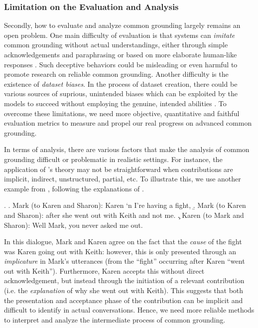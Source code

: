 \subsubsection{Limitation on the Evaluation and Analysis}

Secondly, how to evaluate and analyze common grounding largely remains an open problem.
One main difficulty of evaluation is that systems can \textit{imitate} common grounding without actual understandings, either through simple acknowledgements and paraphrasing \citep{weizenbaum1966eliza} or based on more elaborate human-like responses \citep{adiwardana2020towards,roller-etal-2021-recipes}. Such deceptive behaviors could be misleading or even harmful to promote research on reliable common grounding. Another difficulty is the existence of \textit{dataset biases}. In the process of dataset creation, there could be various sources of suprious, unintended biases \citep{goyal2017making,gururangan-etal-2018-annotation,geva-etal-2019-modeling} which can be exploited by the models to succeed without employing the genuine, intended abilities \citep{geirhos2020shortcut}. To overcome these limitations, we need more objective, quantitative and faithful evaluation metrics to measure and propel our real progress on advanced common grounding.

In terms of analysis, there are various factors that make the analysis of common grounding difficult or problematic in realistic settings. For instance, the application of \citeauthor{clark1989contributing}'s theory may not be straightforward when contributions are implicit, indirect, unstructured, partial, etc. To illustrate this, we use another example from \citet{Sacks1974ASS}, following the explanations of \citet{lascarides2009agreement}.

\ex. \label{ex_2:event_reference}
\a. Mark (to Karen and Sharon):\; Karen `n I're having a fight,
\b. Mark (to Karen and Sharon):\; after she went out with Keith and not me.
\c. Karen (to Mark and Sharon):\; Well Mark, you never asked me out.

In this dialogue, Mark and Karen agree on the fact that the \textit{cause} of the fight was Karen going out with Keith: however, this is only presented through an \textit{implicature} in Mark's utterances (from the ``fight'' occurring after Karen ``went out with Keith''). Furthermore, Karen accepts this without direct acknowledgement, but instead through the initiation of a relevant contribution (i.e. the \textit{explanation} of why she went out with Keith). This suggests that both the presentation and acceptance phase of the contribution can be implicit and difficult to identify in actual conversations. Hence, we need more reliable methods to interpret and analyze the intermediate process of common grounding.

